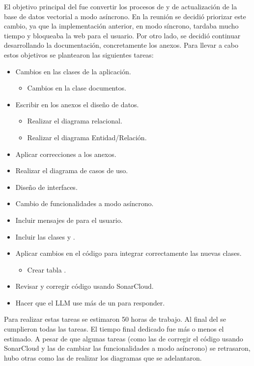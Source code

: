 El objetivo principal del  fue convertir los procesos de  y de actualización de la base de datos vectorial a modo asíncrono. En la reunión se decidió priorizar este cambio, ya que la implementación anterior, en modo síncrono, tardaba mucho tiempo y bloqueaba la web para el usuario. Por otro lado, se decidió continuar desarrollando la documentación, concretamente los anexos. Para llevar a cabo estos objetivos se plantearon las siguientes tareas:
\begin{itemize}
\tightlist
	\item Cambios en las clases de la aplicación.
	\begin{itemize}
	\tightlist
		\item Cambios en la clase documentos.
	\end{itemize} 
	\item Escribir en los anexos el diseño de datos.
	\begin{itemize}
	\tightlist
		\item Realizar el diagrama relacional.
		\item Realizar el diagrama Entidad/Relación.
	\end{itemize}
	\item Aplicar correcciones a los anexos.
	\item Realizar el diagrama de casos de uso.
	\item Diseño de interfaces.
	\item Cambio de funcionalidades a modo asíncrono.
	\item Incluir mensajes de  para el usuario.
	\item Incluir las clases  y .
	\item Aplicar cambios en el código para integrar correctamente las nuevas clases.
	\begin{itemize}
	\tightlist
		\item Crear tabla .
	\end{itemize}
	\item Revisar y corregir código usando SonarCloud.
	\item Hacer que el LLM use más de un  para responder.
\end{itemize}

Para realizar estas tareas se estimaron 50 horas de trabajo. Al final del  se cumplieron todas las tareas. El tiempo final dedicado fue más o menos el estimado. A pesar de que algunas tareas (como las de corregir el código usando SonarCloud y las de cambiar las funcionalidades a modo asíncrono) se retrasaron, hubo otras como las de realizar los diagramas que se adelantaron.

